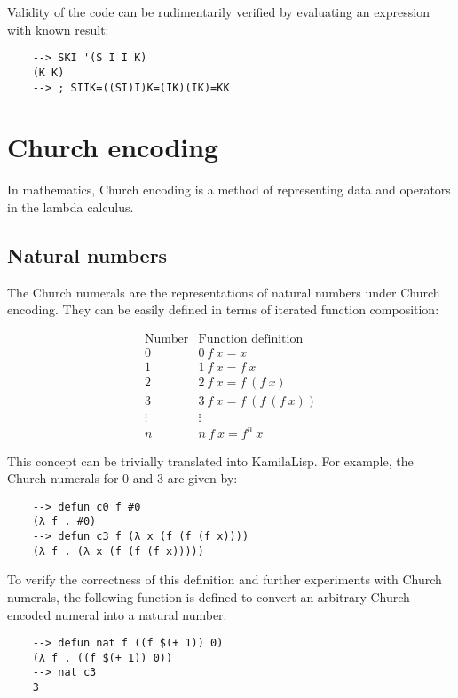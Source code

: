 Validity of the code can be rudimentarily verified by evaluating an expression with known result:

\begin{Verbatim}
    --> SKI '(S I I K)
    (K K)
    --> ; SIIK=((SI)I)K=(IK)(IK)=KK
\end{Verbatim}

\section{Church encoding}

In mathematics, Church encoding is a method of representing data and operators in the lambda calculus.

\subsection{Natural numbers}

The Church numerals are the representations of natural numbers under Church encoding. They can be easily defined in terms of iterated function composition:

$$
\begin{array}{r|l}
    {\text{Number}}&{\text{Function definition}}\\
    \hline
    0&0\ f\ x=x\\
    1&1\ f\ x=f\ x\\
    2&2\ f\ x=f\ (f\ x)\\
    3&3\ f\ x=f\ (f\ (f\ x))\\
    \vdots&\vdots \\
    n&n\ f\ x=f^{n}\ x
\end{array}
$$

This concept can be trivially translated into KamilaLisp. For example, the Church numerals for 0 and 3 are given by:

\begin{Verbatim}
    --> defun c0 f #0
    (λ f . #0)
    --> defun c3 f (λ x (f (f (f x))))
    (λ f . (λ x (f (f (f x)))))
\end{Verbatim}

To verify the correctness of this definition and further experiments with Church numerals, the following function is defined to convert an arbitrary Church-encoded numeral into a natural number:

\begin{Verbatim}
    --> defun nat f ((f $(+ 1)) 0)
    (λ f . ((f $(+ 1)) 0))
    --> nat c3
    3
\end{Verbatim}

